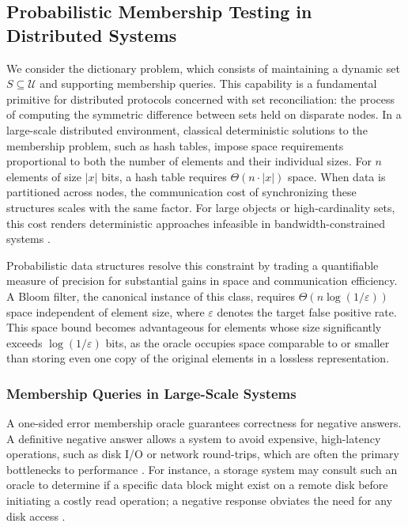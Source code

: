 \subsection{Probabilistic Membership Testing in Distributed Systems}

We consider the dictionary problem, which consists of maintaining a dynamic set $S \subseteq \mathcal{U}$ and supporting membership queries. This capability is a fundamental primitive for distributed protocols concerned with set reconciliation: the process of computing the symmetric difference between sets held on disparate nodes. In a large-scale distributed environment, classical deterministic solutions to the membership problem, such as hash tables, impose space requirements proportional to both the number of elements and their individual sizes. For $n$ elements of size $|x|$ bits, a hash table requires $\Theta(n \cdot |x|)$ space. When data is partitioned across nodes, the communication cost of synchronizing these structures scales with the same factor. For large objects or high-cardinality sets, this cost renders deterministic approaches infeasible in bandwidth-constrained systems \cite{Liu2014ParBFAP, Chang2006BigtableAD}.

Probabilistic data structures resolve this constraint by trading a quantifiable measure of precision for substantial gains in space and communication efficiency. A Bloom filter, the canonical instance of this class, requires $\Theta(n \log(1/\varepsilon))$ space independent of element size, where $\varepsilon$ denotes the target false positive rate. This space bound becomes advantageous for elements whose size significantly exceeds $\log(1/\varepsilon)$ bits, as the oracle occupies space comparable to or smaller than storing even one copy of the original elements in a lossless representation.

\subsubsection{Membership Queries in Large-Scale Systems}

A one-sided error membership oracle guarantees correctness for negative answers. A definitive negative answer allows a system to avoid expensive, high-latency operations, such as disk I/O or network round-trips, which are often the primary bottlenecks to performance \cite{Tarkoma2012TheoryAP, Chang2006BigtableAD}. For instance, a storage system may consult such an oracle to determine if a specific data block might exist on a remote disk before initiating a costly read operation; a negative response obviates the need for any disk access \cite{Chang2006BigtableAD, Tarkoma2012TheoryAP}.

